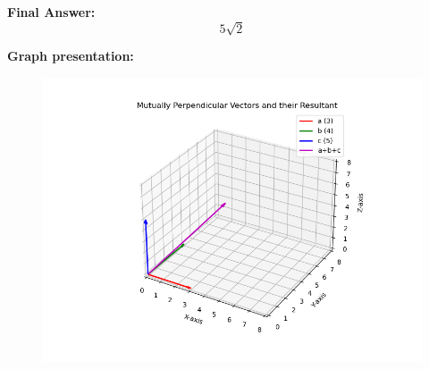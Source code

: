 \documentclass[journal]{IEEEtran}
\begin{document}
\bigskip

\textbf{Final Answer:}
\[
\boxed{5\sqrt{2}}
\]



\textbf{Graph presentation:}
\begin{figure}[H]
\begin{center}
\includegraphics[width=0.6\columnwidth]{figs/fig4.png}
\end{center}
\caption{}
\label{fig:Fig}
\end{figure}    
\end{document}
